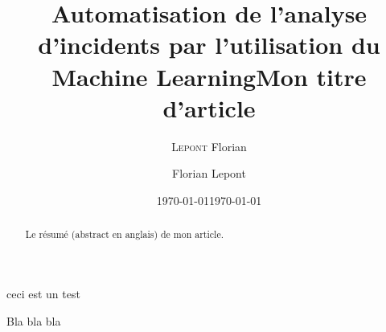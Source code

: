 \documentclass[a4paper,10pt]{report}
\title{Automatisation de l'analyse d'incidents par l'utilisation du Machine Learning}
\author{\textsc{Lepont} Florian}
\date{\today} %
\title{Mon titre d'article}
\date{\today}
\author{Florian Lepont}
\begin{document}
	
\maketitle

\begin{thanks}
	ceci est un test
\end{thanks}

\begin{abstract}
Le résumé (abstract en anglais) de mon article.
\end{abstract}


\tableofcontents


Bla bla bla

\listoffigures
\listoftables
\printindex
\end{document}
